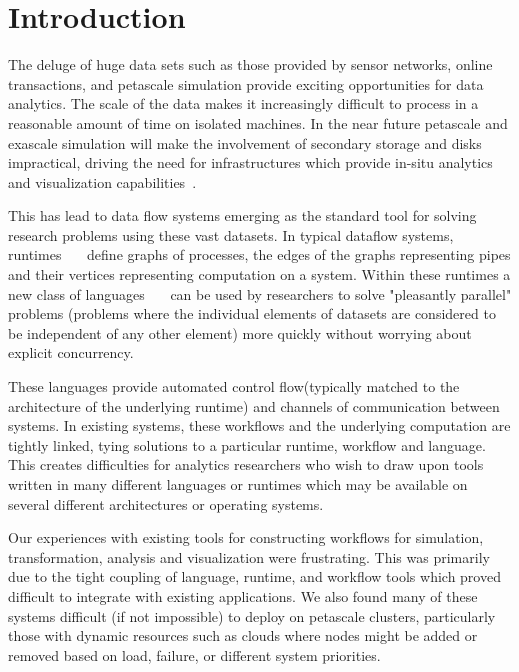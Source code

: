 \section{Introduction}

The deluge of huge data sets such as those provided by sensor
networks, online transactions, and petascale simulation provide 
exciting opportunities for data analytics.  
The scale of the data makes it increasingly difficult to process 
in a reasonable amount of time on isolated machines.
In the near future petascale and exascale simulation will make 
the involvement of secondary storage and disks impractical, driving
the need for infrastructures which provide in-situ analytics and
visualization capabilities~\cite{in-situ}.


This has lead to data flow systems emerging
as the standard tool for solving research problems using these vast
datasets.  In typical dataflow systems,
runtimes~\cite{dean2008msd}~\cite{bialecki:hfr}~\cite{isard2007ddd}
define graphs of processes, the edges of the graphs
representing pipes and their vertices representing computation on a
system.  Within these runtimes a new class of
languages~\cite{pike2005idp}~\cite{yu2008dsg}~\cite{olston2008pln} can
be used by researchers to solve "pleasantly parallel" problems
(problems where the individual elements of datasets are considered
to be independent of any other element) more quickly without worrying
about explicit concurrency.

These languages provide automated control flow(typically matched
to the architecture of the underlying runtime) and channels of
communication between systems.  In existing systems, these workflows
and the underlying computation are tightly linked, tying solutions
to a particular runtime, workflow and language.  This creates
difficulties for analytics researchers who wish to draw upon tools
written in many different languages or runtimes which may be available
on several different architectures or operating systems.

Our experiences with existing tools for constructing workflows
for simulation, transformation, analysis and visualization were frustrating.
This was primarily due to the tight coupling of language, runtime, and
workflow tools which proved difficult to integrate with existing
applications.  
We also found many of these systems difficult (if not impossible)
to deploy on petascale clusters, particularly those with dynamic
resources such as clouds where nodes might be added or removed based
on load, failure, or different system priorities.

